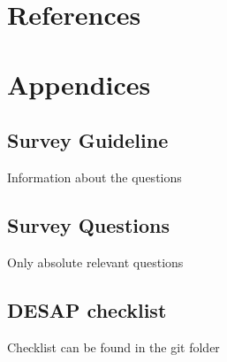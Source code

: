 \documentclass[12pt,a4paper,paper=a4,oneside,titlepage,pdftex]{scrartcl}
\begin{document}
\section*{References}

\renewcommand\refname{\vskip -1cm}


\section*{Appendices}

\subsection*{Survey Guideline}
Information about the questions

\subsection*{Survey Questions}
Only absolute relevant questions

\subsection*{DESAP checklist}
Checklist can be found in the git folder
\end{document}
